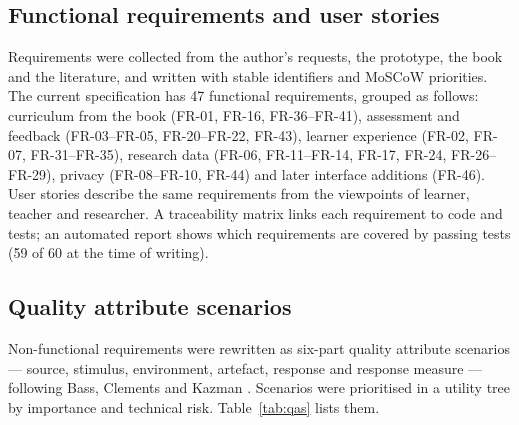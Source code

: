 \subsection{Functional requirements and user stories}

Requirements were collected from the author's requests, the prototype, the book and the literature, and
written with stable identifiers and MoSCoW priorities. The current specification has 47 functional
requirements, grouped as follows: curriculum from the book (FR-01, FR-16, FR-36--FR-41), assessment and
feedback (FR-03--FR-05, FR-20--FR-22, FR-43), learner experience (FR-02, FR-07, FR-31--FR-35), research
data (FR-06, FR-11--FR-14, FR-17, FR-24, FR-26--FR-29), privacy (FR-08--FR-10, FR-44) and
later interface additions (FR-46). User stories
describe the same requirements from the viewpoints of learner, teacher and researcher. A traceability matrix
links each requirement to code and tests; an automated report shows which requirements are covered by
passing tests (59 of 60 at the time of writing).

\subsection{Quality attribute scenarios}

Non-functional requirements were rewritten as six-part quality attribute scenarios --- source, stimulus,
environment, artefact, response and response measure --- following Bass, Clements and Kazman
\cite{SRC-047}. Scenarios were prioritised in a utility tree by importance and technical risk.
Table~\ref{tab:qas} lists them.


